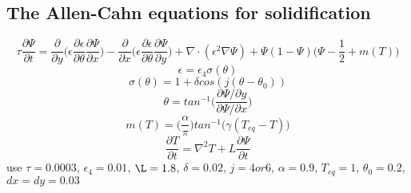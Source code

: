 \documentclass[12pt]{extarticle}
\begin{document}
\subsection*{The Allen-Cahn equations for solidification}
\begin{equation}
\tau \frac{\partial \Psi}{\partial t} = \frac{\partial}{\partial y} \Big( \epsilon \frac{\partial \epsilon}{\partial \theta} \frac{\partial \Psi}{ \partial x} \Big)- \frac{\partial}{\partial x} \Big( \epsilon \frac{\partial \epsilon}{\partial \theta} \frac{\partial \Psi}{ \partial y} \Big) + \nabla \cdot ( \epsilon^{2} \nabla \Psi) + \Psi (1-\Psi) \Big(\Psi-\frac{1}{2}+m(T) \Big)
\end{equation}
\begin{equation}
\epsilon = \epsilon_{4} \sigma(\theta)
\end{equation}
\begin{equation}
\sigma(\theta) = 1 + \delta cos(j(\theta - \theta_{0}))
\end{equation}
\begin{equation}
\theta = tan^{-1} \Big( \frac{\partial \Psi / \partial y}{\partial \Psi / \partial x } \Big)
\end{equation}
\begin{equation}
m(T) = \Big(\frac{\alpha}{\pi}\Big) tan^{-1}\Big( \gamma (T_{eq} - T) \Big)
\end{equation}
\begin{equation}
\frac{\partial T}{\partial t} = \nabla^{2} T + L \frac{\partial \Psi}{\partial t}
\end{equation}
use $\tau = 0.0003$, $\epsilon_{4} = 0.01$, $\L = 1.8$, $\delta = 0.02$, $j = 4 or 6$, $\alpha = 0.9$, $T_{eq} = 1$, $\theta_{0} = 0.2$, $dx=dy=0.03$
\end{document}
